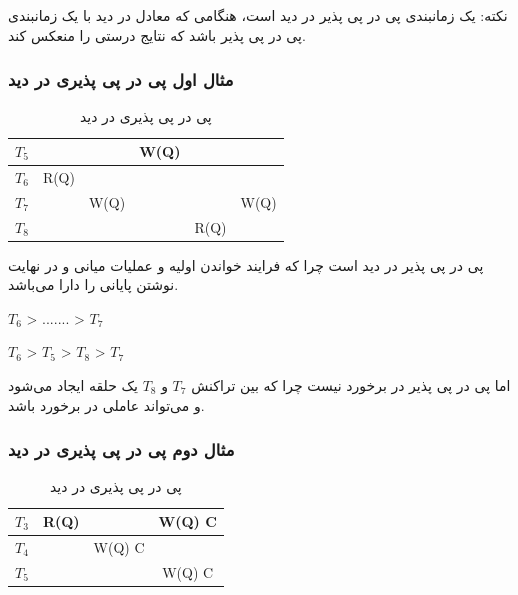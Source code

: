 نکته: یک زمانبندی پی در پی پذیر در دید است، هنگامی که معادل در دید با یک
زمانبندی پی در پی پذیر باشد که نتایج درستی را منعکس کند.

\subsubsection{مثال اول پی در پی پذیری در دید}

\begin{LTR}
    \begin{table}[h]
        \centering
        \begin{RTL}
            \caption{پی در پی پذیری در دید}
        \end{RTL}
        \begin{tabular}{c|c|c|c|c|c}
            $T_{5}$ & & & W(Q) & & \\ \hline
            $T_{6}$ & R(Q) & & & &  \\ \hline
            $T_{7}$ & & W(Q) & & & W(Q) \\ \hline
            $T_{8}$ & & & & R(Q) & \\
        \end{tabular}
    \end{table}
\end{LTR}

پی در پی پذیر در دید است چرا که فرایند خواندن اولیه و عملیات میانی و در نهایت
نوشتن پایانی را دارا می‌باشد.

\begin{LTR}
    $T_{6}$ > ....... > $T_{7}$

    $T_{6}$ > $T_{5}$ > $T_{8}$ > $T_{7}$
\end{LTR}

اما پی در پی پذیر در برخورد نیست چرا که بین تراکنش $T_{7}$ و $T_{8}$ یک حلقه
ایجاد می‌شود و می‌تواند عاملی در برخورد باشد.

\subsubsection{مثال دوم پی در پی پذیری در دید}

\begin{LTR}
    \begin{table}[h]
        \centering
        \begin{RTL}
            \caption{پی در پی پذیری در دید}
        \end{RTL}
        \begin{tabular}{c|c|c|c}
            $T_{3}$ & R(Q) & & W(Q) C \\ \hline
            $T_{4}$ & & W(Q) C &  \\ \hline
            $T_{5}$ & & & W(Q) C \\
        \end{tabular}
    \end{table}
\end{LTR}

